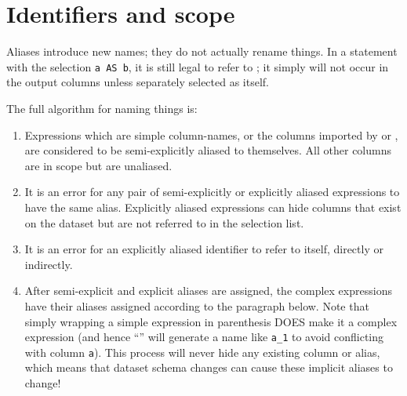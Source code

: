 \documentclass{article}
\begin{document}
\section{Identifiers and scope}

Aliases introduce new names; they do not actually rename things.  In a
statement with the selection \lstinline|a AS b|, it is still legal to
refer to ; it simply will not occur in the output columns
unless separately selected as itself.

The full algorithm for naming things is:
\begin{enumerate}
\item Expressions which are simple column-names, or the columns
  imported by \code{*} or \code{:*}, are considered to be
  semi-explicitly aliased to themselves.  All other columns are in
  scope but are unaliased.
\item It is an error for any pair of semi-explicitly or explicitly
  aliased expressions to have the same alias.  Explicitly aliased
  expressions can hide columns that exist on the dataset but are not
  referred to in the selection list.
\item It is an error for an explicitly aliased identifier to refer to
  itself, directly or indirectly.
\item After semi-explicit and explicit aliases are assigned, the
  complex expressions have their aliases assigned according to the
  paragraph below.  Note that simply wrapping a simple expression in
  parenthesis DOES make it a complex expression (and hence
  ``'' will generate a name like \lstinline|a_1| to avoid
  conflicting with column \lstinline|a|).  This process will never
  hide any existing column or alias, which means that dataset schema
  changes can cause these implicit aliases to change!
\end{enumerate}
\end{document}

